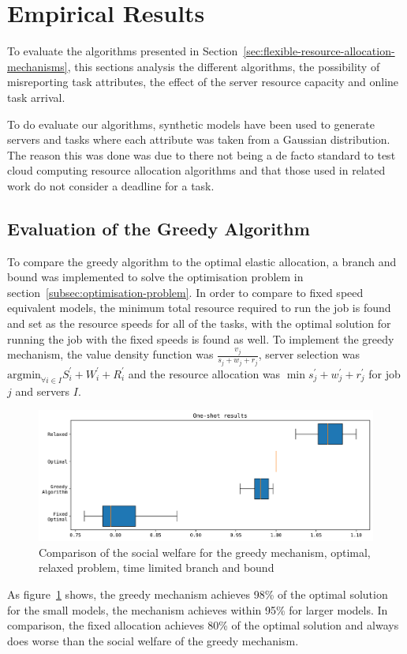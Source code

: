 \section{Empirical Results}
\label{sec:empirical-results}
To evaluate the algorithms presented in Section~\ref{sec:flexible-resource-allocation-mechanisms},
this sections analysis the different algorithms, the possibility of misreporting task attributes,
the effect of the server resource capacity and online task arrival.

To do evaluate our algorithms, synthetic models have been used to generate servers and tasks where
each attribute was taken from a Gaussian distribution. The reason this was done was due to there not
being a de facto standard to test cloud computing resource allocation algorithms and that those used
in related work do not consider a deadline for a task.

\subsection{Evaluation of the Greedy Algorithm}
\label{subsec:evaluation-of-the-greedy-algorithm}
To compare the greedy algorithm to the optimal elastic allocation, a branch and bound was implemented to solve the
optimisation problem in section~\ref{subsec:optimisation-problem}. In order to compare to fixed speed equivalent models,
the minimum total resource required to run the job is found and set as the resource speeds for all of the tasks, with
the optimal solution for running the job with the fixed speeds is found as well. To implement the greedy mechanism, the
value density function was $\frac{v_j}{s_j + w_j + r_j}$, server selection was
$\text{argmin}_{\forall i \in I} S^{'}_i + W^{'}_i + R^{'}_i$ and the resource allocation was
$\min s^{'}_j + w^{'}_j + r^{'}_j$ for job $j$ and servers $I$.

\begin{figure}[h]
    \centering
    \includegraphics[width=\linewidth]{figs/greedy/greedy_algorithms.png}
    \caption{Comparison of the social welfare for the greedy mechanism, optimal, relaxed problem, time limited branch and bound}
    \label{fig:greedy-mechanism-comparison}
\end{figure}
As figure~\ref{fig:greedy-mechanism-comparison} shows, the greedy mechanism achieves 98\% of the optimal solution for
the small models, the mechanism achieves within 95\% for larger models. In comparison, the fixed allocation achieves
80\% of the optimal solution and always does worse than the social welfare of the greedy mechanism.

